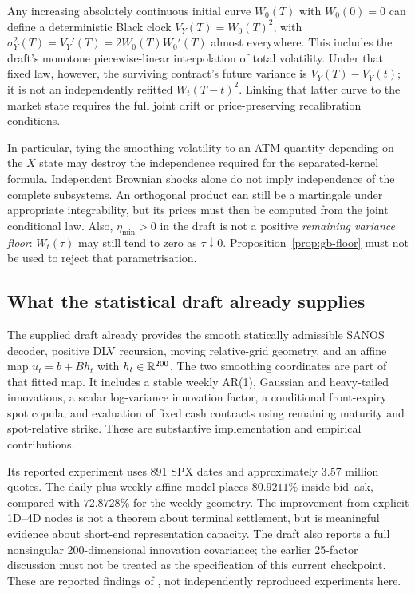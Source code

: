 \documentclass[11pt,a4paper]{article}
\numberwithin{equation}{section}
\theoremstyle{definition}\newtheorem{definition}[theorem]{Definition}
\theoremstyle{remark}\newtheorem{remark}[theorem]{Remark}
\begin{document}
Any increasing absolutely continuous initial curve $W_0(T)$ with $W_0(0)=0$ can define a deterministic Black clock $V_Y(T)=W_0(T)^2$, with $\sigma_Y^2(T)=V_Y'(T)=2W_0(T)W_0'(T)$ almost everywhere. This includes the draft's monotone piecewise-linear interpolation of total volatility. Under that fixed law, however, the surviving contract's future variance is $V_Y(T)-V_Y(t)$; it is not an independently refitted $W_t(T-t)^2$. Linking that latter curve to the market state requires the full joint drift or price-preserving recalibration conditions.

In particular, tying the smoothing volatility to an ATM quantity depending on the $X$ state may destroy the independence required for the separated-kernel formula. Independent Brownian shocks alone do not imply independence of the complete subsystems. An orthogonal product can still be a martingale under appropriate integrability, but its prices must then be computed from the joint conditional law. Also, $\eta_{\min}>0$ in the draft is not a positive \emph{remaining variance floor}: $W_t(\tau)$ may still tend to zero as $\tau\downarrow0$. Proposition~\ref{prop:gb-floor} must not be used to reject that parametrisation.

\subsection{What the statistical draft already supplies}
The supplied draft already provides the smooth statically admissible SANOS decoder, positive DLV recursion, moving relative-grid geometry, and an affine map $u_t=b+B h_t$ with $h_t\in\mathbb R^{200}$. The two smoothing coordinates are part of that fitted map. It includes a stable weekly AR(1), Gaussian and heavy-tailed innovations, a scalar log-variance innovation factor, a conditional front-expiry spot copula, and evaluation of fixed cash contracts using remaining maturity and spot-relative strike. These are substantive implementation and empirical contributions.

Its reported experiment uses 891 SPX dates and approximately 3.57 million quotes. The daily-plus-weekly affine model places $80.9211\%$ inside bid--ask, compared with $72.8728\%$ for the weekly geometry. The improvement from explicit 1D--4D nodes is not a theorem about terminal settlement, but is meaningful evidence about short-end representation capacity. The draft also reports a full nonsingular 200-dimensional innovation covariance; the earlier 25-factor discussion must not be treated as the specification of this current checkpoint. These are reported findings of \cite{DYSANOSv2}, not independently reproduced experiments here.
\end{document}
